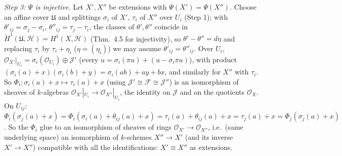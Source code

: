 \documentclass[11pt]{article}
\begin{document}
\emph{Step 3: $\Psi$ is injective.} Let $X',X''$ be extensions with $\Psi(X')=\Psi(X'')$. Choose an affine cover $\mathfrak U$ and splittings $\sigma_i$ of $X'$, $\tau_i$ of $X''$ over $U_i$ (Step 1); with $\theta'_{ij}=\sigma_j-\sigma_i$, $\theta''_{ij}=\tau_j-\tau_i$, the classes of $\theta',\theta''$ coincide in $\check H^1(\mathfrak U,\mathcal H)=H^1(X,\mathcal H)$ (Thm.~4.5 for injectivity), so $\theta'-\theta''=d\eta$ and replacing $\tau_i$ by $\tau_i+\eta_i$ ($\eta=(\eta_i)$) we may assume $\theta'_{ij}=\theta''_{ij}$. Over $U_i$, $\mathcal O_{X'}|_{U_i}=\sigma_i(\mathcal O_{U_i})\oplus\mathcal J'$ (every $u=\sigma_i(\pi u)+(u-\sigma_i\pi u)$), with product $(\sigma_i(a)+x)(\sigma_i(b)+y)=\sigma_i(ab)+ay+bx$, and similarly for $X''$ with $\tau_i$. So $\Phi_i:\sigma_i(a)+x\mapsto\tau_i(a)+x$ (using $\mathcal J'\cong\mathcal F\cong\mathcal J''$) is an isomorphism of sheaves of $k$-algebras $\mathcal O_{X'}|_{U_i}\to\mathcal O_{X''}|_{U_i}$, the identity on $\mathcal J$ and on the quotients $\mathcal O_X$. On $U_{ij}$: $\Phi_i(\sigma_j(a)+x)=\Phi_i(\sigma_i(a)+\theta_{ij}(a)+x)=\tau_i(a)+\theta_{ij}(a)+x=\tau_j(a)+x=\Phi_j(\sigma_j(a)+x)$. So the $\Phi_i$ glue to an isomorphism of sheaves of rings $\mathcal O_{X'}\to\mathcal O_{X''}$, i.e.\ (same underlying space) an isomorphism of $k$-schemes $X''\to X'$ (and its inverse $X'\to X''$) compatible with all the identifications: $X'\cong X''$ as extensions.
\end{document}
